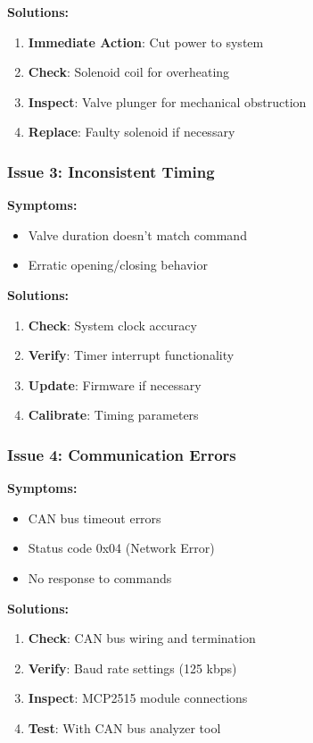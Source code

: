 \documentclass[11pt,a4paper]{article}
\begin{document}
\textbf{Solutions:}
\begin{enumerate}
    \item \textbf{Immediate Action}: Cut power to system
    \item \textbf{Check}: Solenoid coil for overheating
    \item \textbf{Inspect}: Valve plunger for mechanical obstruction
    \item \textbf{Replace}: Faulty solenoid if necessary
\end{enumerate}

\subsubsection{Issue 3: Inconsistent Timing}
\textbf{Symptoms:}
\begin{itemize}
    \item Valve duration doesn't match command
    \item Erratic opening/closing behavior
\end{itemize}

\textbf{Solutions:}
\begin{enumerate}
    \item \textbf{Check}: System clock accuracy
    \item \textbf{Verify}: Timer interrupt functionality
    \item \textbf{Update}: Firmware if necessary
    \item \textbf{Calibrate}: Timing parameters
\end{enumerate}

\subsubsection{Issue 4: Communication Errors}
\textbf{Symptoms:}
\begin{itemize}
    \item CAN bus timeout errors
    \item Status code 0x04 (Network Error)
    \item No response to commands
\end{itemize}

\textbf{Solutions:}
\begin{enumerate}
    \item \textbf{Check}: CAN bus wiring and termination
    \item \textbf{Verify}: Baud rate settings (125 kbps)
    \item \textbf{Inspect}: MCP2515 module connections
    \item \textbf{Test}: With CAN bus analyzer tool
\end{enumerate}
\end{document}
